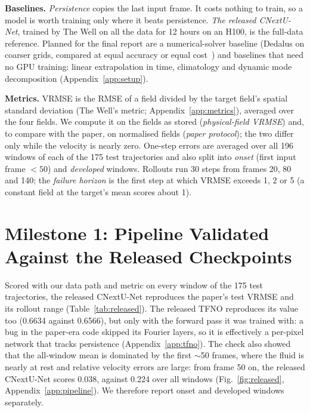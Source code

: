 \documentclass[11pt]{article}
\begin{document}
\textbf{Baselines.} \emph{Persistence} copies the last input frame. It costs nothing to train, so a model is worth
training only where it beats persistence. \emph{The released CNextU-Net}, trained by The Well on all the data for 12
hours on an H100, is the full-data reference. Planned for the final report are a numerical-solver baseline (Dedalus
on coarser grids, compared at equal accuracy or equal cost~\cite{mcgreivy2024weak}) and baselines that need no GPU
training: linear extrapolation in time, climatology and dynamic mode decomposition (Appendix~\ref{app:setup}).

\textbf{Metrics.} VRMSE is the RMSE of a field divided by the target field's spatial standard deviation (The
Well's metric; Appendix~\ref{app:metrics}), averaged over the four fields. We compute it on the fields as stored
(\emph{physical-field VRMSE}) and, to compare with the paper, on normalised fields (\emph{paper protocol}); the two
differ only while the velocity is nearly zero. One-step errors are averaged over all 196 windows of each of the 175
test trajectories and also split into \emph{onset} (first input frame $<50$) and \emph{developed} windows. Rollouts
run 30 steps from frames 20, 80 and 140; the \emph{failure horizon} is the first step at which VRMSE exceeds 1, 2 or
5 (a constant field at the target's mean scores about 1).

\section{Milestone 1: Pipeline Validated Against the Released Checkpoints}
\label{sec:m1}

Scored with our data path and metric on every window of the 175 test trajectories, the released CNextU-Net
reproduces the paper's test VRMSE and its rollout range (Table~\ref{tab:released}). The released TFNO reproduces its
value too (0.6634 against 0.6566), but only with the forward pass it was trained with: a bug in the paper-era code
skipped its Fourier layers, so it is effectively a per-pixel network that tracks persistence
(Appendix~\ref{app:tfno}). The check also showed that the all-window mean is dominated by the first $\sim$50 frames,
where the fluid is nearly at rest and relative velocity errors are large: from frame 50 on, the released CNextU-Net
scores 0.038, against 0.224 over all windows (Fig.~\ref{fig:released}, Appendix~\ref{app:pipeline}). We therefore
report onset and developed windows separately.
\end{document}
